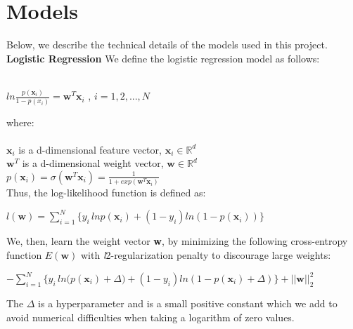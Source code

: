 \documentclass{sig-alternate-05-2015}
\begin{document}
\section{Models}
Below, we describe the technical details of the models used in this project.  \\


\noindent
\textbf{Logistic Regression} 
\noindent 
We define the logistic regression model as follows: \\ \\

\vspace{-1em}
\begin{center}
$ln\frac{p(\textbf{x}_{i})}{1-p(x_{i})} = \textbf{w}^{T}\textbf{x}_{i}$ ,  $i = 1, 2, ..., N$ \\
\end{center}
where: \\ \\
$\textbf{x}_{i}$ is a d-dimensional feature vector,  $\textbf{x}_{i} \in \mathbb{R}^{d}$ \\
$ \textbf{w}^{T}$ is a d-dimensional weight vector,  $ \textbf{w} \in \mathbb{R}^{d} $ \\
$ p(\textbf{x}_{i})  = \sigma(\textbf{w}^{T}\textbf{x}_{i}) = \frac{1}{1 + exp(\textbf{w}^{T}\textbf{x}_{i})}$ \\

\noindent 
Thus, the log-likelihood function is defined as: \\
\begin{center}
$ \textit{l}(\textbf{w}) = \sum_{i = 1}^{N} \Big\{y_{i}\,ln p(\textbf{x}_{i}) + (1 - y_{i})ln(1 - p(\textbf{x}_{i})) \Big\} $ \\
\end{center}

\noindent 
We, then, learn the weight vector \textbf{w}, by minimizing the following cross-entropy function  $E(\textbf{w})$ with \textit{l}2-regularization penalty to discourage large weights: \\
\begin{center}
\small
$ -\sum_{i = 1}^{N} \Big\{y_{i}\,ln \big(p(\textbf{x}_{i}) + \Delta\big) + (1 - y_{i})ln(1 - p(\textbf{x}_{i}) + \Delta) \Big\} + || \textbf{w} ||^{2}_{2}$ \\
\small
\end{center} 

\noindent 
The $\Delta$ is a hyperparameter and is a small positive constant which we add to avoid numerical difficulties when taking a logarithm of zero values. \\
\end{document}
